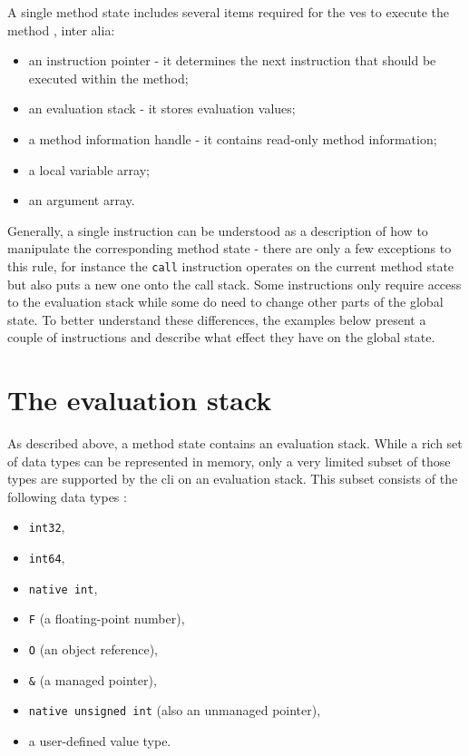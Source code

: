 \documentclass[declaration,shortabstract,english,mgr]{iithesis}
\begin{document}
A single method state includes several items required for the \acrshort{ves} to execute the method \cite{ecmaStandard}, inter alia:
\begin{itemize}
	\item{an instruction pointer - it determines the next instruction that should be executed within the method;}
	\item{an evaluation stack - it stores evaluation values;}
	\item{a method information handle - it contains read-only method information;}
	\item{a local variable array;}
	\item{an argument array.}
\end{itemize}

Generally, a single instruction can be understood as a description of how to manipulate the corresponding method state - there are only a few exceptions to this rule, for instance the \texttt{call} instruction operates on the current method state but also puts a new one onto the call stack. Some instructions only require access to the evaluation stack while some do need to change other parts of the global state. To better understand these differences, the examples below present a couple of instructions and describe what effect they have on the global state.

\section{The evaluation stack}

As described above, a method state contains an evaluation stack. While a rich set of data types can be represented in memory, only a very limited subset of those types are supported by the \acrshort{cli} on an evaluation stack. This subset consists of the following data types \cite{ecmaStandard}:
\begin{itemize}
	\item{\texttt{int32},}
	\item{\texttt{int64},}
	\item{\texttt{native int},}
	\item{\texttt{F} (a floating-point number),}
	\item{\texttt{O} (an object reference),}
	\item{\texttt{\&} (a managed pointer),}
	\item{\texttt{native unsigned int} (also an unmanaged pointer),}
	\item{a user-defined value type.}
\end{itemize}
\end{document}
